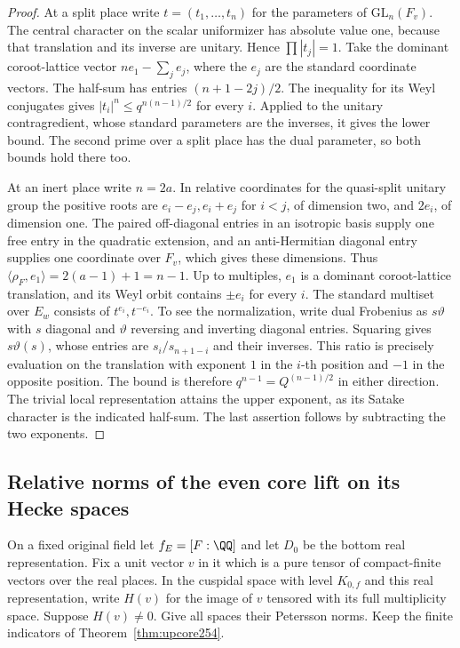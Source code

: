 \documentclass[a4paper,11pt]{article}
\theoremstyle{definition}
\theoremstyle{remark}
\numberwithin{equation}{section}
\begin{document}
\begin{proof}
At a split place write \(t=(t_1,\ldots,t_n)\) for the parameters
of \(\mathrm{GL}_n(F_v)\). The central character on the scalar
uniformizer has absolute value one, because that translation and its
inverse are unitary. Hence \(\prod |t_j|=1\). Take the dominant
coroot-lattice vector \(n e_1-\sum_j e_j\), where the \(e_j\) are the
standard coordinate vectors. The half-sum has entries
\((n+1-2j)/2\). The inequality for its Weyl conjugates gives
\(|t_i|^n\le q^{n(n-1)/2}\) for every \(i\). Applied to the unitary
contragredient, whose standard parameters are the inverses, it gives
the lower bound. The second prime over a split place has the dual
parameter, so both bounds hold there too.

At an inert place write \(n=2a\). In relative coordinates for the
quasi-split unitary group the positive roots are \(e_i-e_j,e_i+e_j\)
for \(i<j\), of dimension two, and \(2e_i\), of dimension one.
The paired off-diagonal entries in an isotropic basis supply one free
entry in the quadratic extension, and an anti-Hermitian diagonal entry
supplies one coordinate over \(F_v\), which gives these dimensions.
Thus \(\langle\rho_F,e_1\rangle=2(a-1)+1=n-1\). Up to multiples,
\(e_1\) is a dominant coroot-lattice translation, and its Weyl orbit
contains \(\pm e_i\) for every \(i\). The standard multiset over \(E_w\)
consists of \(t^{e_i},t^{-e_i}\). To see the normalization, write
dual Frobenius as \(s\vartheta\) with \(s\) diagonal and \(\vartheta\)
reversing and inverting diagonal entries. Squaring gives \(s\vartheta(s)\),
whose entries are \(s_i/s_{n+1-i}\) and their inverses. This ratio is
precisely evaluation on the translation with exponent \(1\) in the
\(i\)-th position and \(-1\) in the opposite position. The bound is
therefore \(q^{n-1}=Q^{(n-1)/2}\) in either direction. The trivial local representation attains the upper
exponent, as its Satake character is the indicated half-sum. The last
assertion follows by subtracting the two exponents.
\end{proof}

\subsection{Relative norms of the even core lift on its Hecke spaces}\label{nav:II-48}
On a fixed original field let \(f_E=[F:\QQ]\) and let \(D_0\)
be the bottom real representation. Fix a unit vector \(v\) in
it which is a pure tensor of compact-finite vectors over the
real places. In the cuspidal space with level \(K_{0,f}\)
and this real representation, write \(H(v)\) for the image
of \(v\) tensored with its full multiplicity space. Suppose
\(H(v)\ne0\). Give all spaces their Petersson norms. Keep the
finite indicators of Theorem~\ref{thm:upcore254}.
\end{document}
